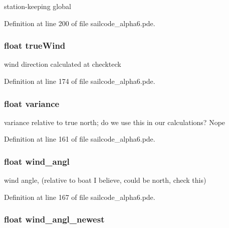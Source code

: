 station-\/keeping global 



\-Definition at line 200 of file sailcode\-\_\-alpha6.\-pde.

\hypertarget{group__group1_gaea221e98c9a7c4e63325dc52ab83c14d}{
\subsubsection[{true\-Wind}]{\setlength{\rightskip}{0pt plus 5cm}float {\bf true\-Wind}}}
\label{group__group1_gaea221e98c9a7c4e63325dc52ab83c14d}


wind direction calculated at checkteck 



\-Definition at line 174 of file sailcode\-\_\-alpha6.\-pde.

\hypertarget{group__group1_gaec967762d2c44e3594070dca470ae334}{
\subsubsection[{variance}]{\setlength{\rightskip}{0pt plus 5cm}float {\bf variance}}}
\label{group__group1_gaec967762d2c44e3594070dca470ae334}


variance relative to true north; do we use this in our calculations? \-Nope 



\-Definition at line 161 of file sailcode\-\_\-alpha6.\-pde.

\hypertarget{group__group1_ga6bc5259b7cc1cb6128495b28f55b0a5d}{
\subsubsection[{wind\-\_\-angl}]{\setlength{\rightskip}{0pt plus 5cm}float {\bf wind\-\_\-angl}}}
\label{group__group1_ga6bc5259b7cc1cb6128495b28f55b0a5d}


wind angle, (relative to boat \-I believe, could be north, check this) 



\-Definition at line 167 of file sailcode\-\_\-alpha6.\-pde.

\hypertarget{group__group1_ga9fcee93bab7f0c81f67b99f8b8597e9c}{
\subsubsection[{wind\-\_\-angl\-\_\-newest}]{\setlength{\rightskip}{0pt plus 5cm}float {\bf wind\-\_\-angl\-\_\-newest}}}
\label{group__group1_ga9fcee93bab7f0c81f67b99f8b8597e9c}


